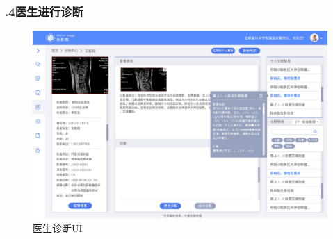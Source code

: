 \documentclass[24pt,a4paper]{article}%
\begin{document}
\subsubsection*{.4医生进行诊断}
\begin{figure}[H]
	\centering
	\includegraphics[width=1\textwidth]{./image/wenzhen-3.png}
	\caption*{医生诊断UI}
\end{figure}

\newpage
\end{document}
